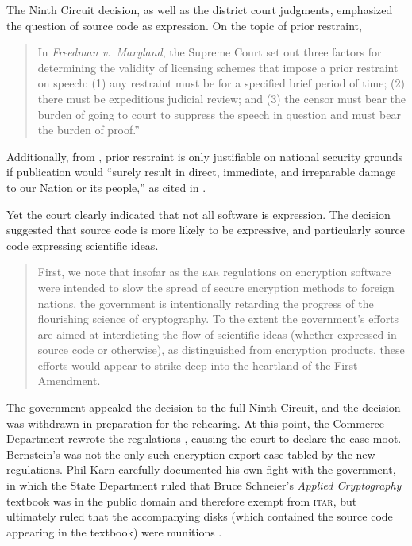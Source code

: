 \documentclass[preprint,twocolumn,5p]{elsarticle}
\begin{document}
The Ninth Circuit decision, as well as the district court judgments, emphasized the question of source code as expression. On the topic of prior restraint,
\begin{quote}
In \textit{Freedman v.\ Maryland}, the Supreme Court set out three factors for determining the validity of licensing schemes that impose a prior restraint on speech: (1) any restraint must be for a specified brief period of time; (2) there must be expeditious judicial review; and (3) the censor must bear the burden of going to court to suppress the speech in question and must bear the burden of proof.''%
\citep[p.~4239]{Bernstein1997}
\end{quote}
Additionally, from , prior restraint is only justifiable on national security grounds if publication would ``surely result in direct, immediate, and irreparable damage to our Nation or its people,'' \citep{NYTvUS} as cited in .

Yet the court clearly indicated that not all software is expression. The decision suggested that source code is more likely to be expressive, and particularly source code expressing scientific ideas.
\begin{quote}
First, we note that insofar as the \textsc{ear} regulations on encryption software were intended to slow the spread of secure encryption methods to foreign nations, the government is intentionally retarding the progress of the flourishing science of cryptography. To the extent the government's efforts are aimed at interdicting the flow of scientific ideas (whether expressed in source code or otherwise), as distinguished from encryption products, these efforts would appear to strike deep into the heartland of the First Amendment. \citep[p.~4242]{Bernstein1997}
\end{quote}

The government appealed the decision to the full Ninth Circuit, and the  decision was withdrawn in preparation for the rehearing. At this point, the Commerce Department rewrote the regulations \citep{EncryptionRule2000}, causing the court to declare the case moot. Bernstein's was not the only such encryption export case tabled by the new regulations. Phil Karn carefully documented his own fight with the government, in which the State Department ruled that Bruce Schneier's \textit{Applied Cryptography} textbook was in the public domain and therefore exempt from \textsc{itar}, but ultimately ruled that the accompanying disks (which contained the source code appearing in the textbook) were munitions \citep{Karn1999}.
\end{document}
